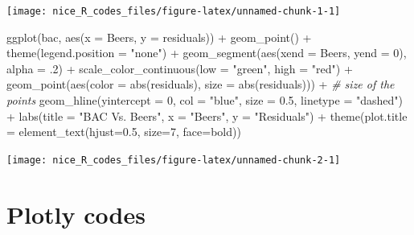 \documentclass[
]{book}
\newenvironment{Shaded}{\begin{snugshade}}{\end{snugshade}}
\newcommand{\AttributeTok}[1]{\textcolor[rgb]{0.77,0.63,0.00}{#1}}
\newcommand{\CommentTok}[1]{\textcolor[rgb]{0.56,0.35,0.01}{\textit{#1}}}
\newcommand{\DecValTok}[1]{\textcolor[rgb]{0.00,0.00,0.81}{#1}}
\newcommand{\FloatTok}[1]{\textcolor[rgb]{0.00,0.00,0.81}{#1}}
\newcommand{\FunctionTok}[1]{\textcolor[rgb]{0.00,0.00,0.00}{#1}}
\newcommand{\NormalTok}[1]{#1}
\newcommand{\SpecialCharTok}[1]{\textcolor[rgb]{0.00,0.00,0.00}{#1}}
\newcommand{\StringTok}[1]{\textcolor[rgb]{0.31,0.60,0.02}{#1}}
\begin{document}
\texttt{[image: nice\_R\_codes\_files/figure-latex/unnamed-chunk-1-1]}

\begin{Shaded}
\begin{Highlighting}[]
\FunctionTok{ggplot}\NormalTok{(bac, }\FunctionTok{aes}\NormalTok{(}\AttributeTok{x =}\NormalTok{ Beers, }\AttributeTok{y =}\NormalTok{ residuals)) }\SpecialCharTok{+}
  \FunctionTok{geom\_point}\NormalTok{() }\SpecialCharTok{+}
  \FunctionTok{theme}\NormalTok{(}\AttributeTok{legend.position =} \StringTok{"none"}\NormalTok{) }\SpecialCharTok{+}
  \FunctionTok{geom\_segment}\NormalTok{(}\FunctionTok{aes}\NormalTok{(}\AttributeTok{xend =}\NormalTok{ Beers, }\AttributeTok{yend =} \DecValTok{0}\NormalTok{), }\AttributeTok{alpha =}\NormalTok{ .}\DecValTok{2}\NormalTok{) }\SpecialCharTok{+}
  \FunctionTok{scale\_color\_continuous}\NormalTok{(}\AttributeTok{low =} \StringTok{"green"}\NormalTok{, }\AttributeTok{high =} \StringTok{"red"}\NormalTok{) }\SpecialCharTok{+}   
  \FunctionTok{geom\_point}\NormalTok{(}\FunctionTok{aes}\NormalTok{(}\AttributeTok{color =} \FunctionTok{abs}\NormalTok{(residuals), }\AttributeTok{size =} \FunctionTok{abs}\NormalTok{(residuals))) }\SpecialCharTok{+}  \CommentTok{\# size of the points}
  \FunctionTok{geom\_hline}\NormalTok{(}\AttributeTok{yintercept =} \DecValTok{0}\NormalTok{, }\AttributeTok{col =} \StringTok{"blue"}\NormalTok{, }\AttributeTok{size =} \FloatTok{0.5}\NormalTok{, }\AttributeTok{linetype =} \StringTok{"dashed"}\NormalTok{) }\SpecialCharTok{+} 
  \FunctionTok{labs}\NormalTok{(}\AttributeTok{title =} \StringTok{"BAC Vs. Beers"}\NormalTok{,}
       \AttributeTok{x =} \StringTok{"Beers"}\NormalTok{,}
       \AttributeTok{y =} \StringTok{"Residuals"}\NormalTok{) }\SpecialCharTok{+}
  \FunctionTok{theme}\NormalTok{(}\AttributeTok{plot.title =} \FunctionTok{element\_text}\NormalTok{(}\AttributeTok{hjust=}\FloatTok{0.5}\NormalTok{, }\AttributeTok{size=}\DecValTok{7}\NormalTok{, }\AttributeTok{face=}\StringTok{\textquotesingle{}bold\textquotesingle{}}\NormalTok{)) }
\end{Highlighting}
\end{Shaded}

\texttt{[image: nice\_R\_codes\_files/figure-latex/unnamed-chunk-2-1]}

\hypertarget{plotly-codes}{%
\section{Plotly codes}\label{plotly-codes}}
\end{document}
